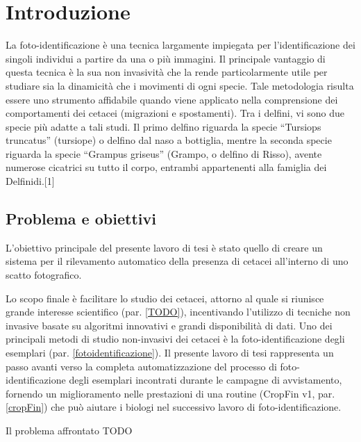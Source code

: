 \chapter{Introduzione}
\label{introduzione}
La foto-identificazione è una tecnica largamente impiegata per l’identificazione dei singoli individui a partire da una o più immagini. Il principale vantaggio di questa tecnica è la sua non invasività che la rende particolarmente utile per studiare sia la dinamicità che i movimenti di ogni specie. Tale metodologia risulta essere uno strumento affidabile quando viene applicato nella comprensione dei comportamenti dei cetacei (migrazioni e spostamenti). Tra i delfini, vi sono due specie più adatte a tali studi.  Il primo delfino riguarda la specie “Tursiops truncatus” (tursiope) o delfino dal naso a bottiglia, mentre la seconda specie riguarda la specie “Grampus griseus” (Grampo, o delfino di Risso), avente numerose cicatrici su tutto il corpo, entrambi appartenenti alla famiglia dei Delfinidi.[1]

\section{Problema e obiettivi}
L'obiettivo principale del presente lavoro di tesi è stato quello di creare un sistema per il rilevamento automatico della presenza di cetacei all'interno di uno scatto fotografico.

Lo scopo finale è facilitare lo studio dei cetacei, attorno al quale si riunisce grande interesse scientifico (par. \ref{TODO}), incentivando l'utilizzo di tecniche non invasive basate su algoritmi innovativi e grandi disponibilità di dati. Uno dei principali metodi di studio non-invasivi dei cetacei è la foto-identificazione degli esemplari (par. \ref{fotoidentificazione}). Il presente lavoro di tesi rappresenta un passo avanti verso la completa automatizzazione del processo di foto-identificazione degli esemplari incontrati durante le campagne di avvistamento, fornendo un miglioramento nelle prestazioni di una routine (CropFin v1, par. \ref{cropFin}) che può aiutare i biologi nel successivo lavoro di foto-identificazione.

Il problema affrontato TODO